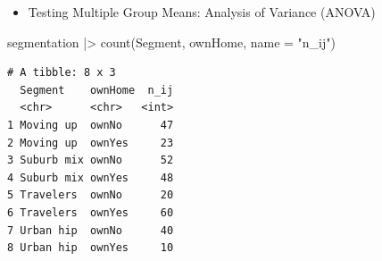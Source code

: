 \documentclass[
  ignorenonframetext,
]{beamer}
\newenvironment{Shaded}{\begin{snugshade}}{\end{snugshade}}
\newcommand{\AttributeTok}[1]{\textcolor[rgb]{0.40,0.45,0.13}{#1}}
\newcommand{\FunctionTok}[1]{\textcolor[rgb]{0.28,0.35,0.67}{#1}}
\newcommand{\NormalTok}[1]{\textcolor[rgb]{0.00,0.23,0.31}{#1}}
\newcommand{\SpecialCharTok}[1]{\textcolor[rgb]{0.37,0.37,0.37}{#1}}
\newcommand{\StringTok}[1]{\textcolor[rgb]{0.13,0.47,0.30}{#1}}
\providecommand{\tightlist}{%
  \setlength{\itemsep}{0pt}\setlength{\parskip}{0pt}}\usepackage{longtable,booktabs,array}
\begin{document}
\begin{frame}[fragile]{}
\label{section-29}
\begin{itemize}
\tightlist
\item
  Testing Multiple Group Means: Analysis of Variance (ANOVA)
\end{itemize}

\tiny

\begin{Shaded}
\begin{Highlighting}[]
\NormalTok{segmentation }\SpecialCharTok{|\textgreater{}} 
  \FunctionTok{count}\NormalTok{(Segment, ownHome, }\AttributeTok{name =} \StringTok{"n\_ij"}\NormalTok{)}
\end{Highlighting}
\end{Shaded}

\begin{verbatim}
# A tibble: 8 x 3
  Segment    ownHome  n_ij
  <chr>      <chr>   <int>
1 Moving up  ownNo      47
2 Moving up  ownYes     23
3 Suburb mix ownNo      52
4 Suburb mix ownYes     48
5 Travelers  ownNo      20
6 Travelers  ownYes     60
7 Urban hip  ownNo      40
8 Urban hip  ownYes     10
\end{verbatim}
\end{frame}
\end{document}
